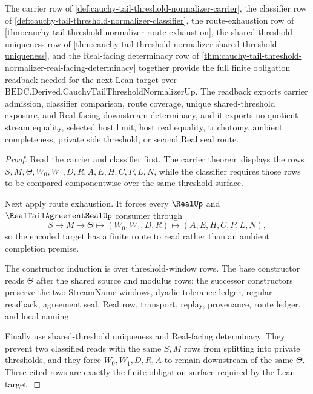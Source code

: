 \begin{theorem}
\label{thm:cauchy-tail-threshold-normalizer-encoded-obligation-readback}
The carrier row of \autoref{def:cauchy-tail-threshold-normalizer-carrier}, the classifier row of \autoref{def:cauchy-tail-threshold-normalizer-classifier}, the route-exhaustion row of \autoref{thm:cauchy-tail-threshold-normalizer-route-exhaustion}, the shared-threshold uniqueness row of \autoref{thm:cauchy-tail-threshold-normalizer-shared-threshold-uniqueness}, and the Real-facing determinacy row of \autoref{thm:cauchy-tail-threshold-normalizer-real-facing-determinacy} together provide the full finite obligation readback needed for the next Lean target over $\mathrm{BEDC.Derived.CauchyTailThresholdNormalizerUp}$. The readback exports carrier admission, classifier comparison, route coverage, unique shared-threshold exposure, and Real-facing downstream determinacy, and it exports no quotient-stream equality, selected host limit, host real equality, trichotomy, ambient completeness, private side threshold, or second Real seal route.
\end{theorem}
\begin{proof}
Read the carrier and classifier first. The carrier theorem displays the rows $S,M,\Theta,W_0,W_1,D,R,A,E,H,C,P,L,N$, while the classifier requires those rows to be compared componentwise over the same threshold surface.

Next apply route exhaustion. It forces every $\RealUp$ and $\RealTailAgreementSealUp$ consumer through
$$
S\longmapsto M\longmapsto\Theta\longmapsto(W_0,W_1,D,R)\longmapsto(A,E,H,C,P,L,N),
$$
so the encoded target has a finite route to read rather than an ambient completion premise.

The constructor induction is over threshold-window rows. The base constructor reads $\Theta$ after the shared source and modulus rows; the successor constructors preserve the two StreamName windows, dyadic tolerance ledger, regular readback, agreement seal, Real row, transport, replay, provenance, route ledger, and local naming.

Finally use shared-threshold uniqueness and Real-facing determinacy. They prevent two classified reads with the same $S,M$ rows from splitting into private thresholds, and they force $W_0,W_1,D,R,A$ to remain downstream of the same $\Theta$. These cited rows are exactly the finite obligation surface required by the Lean target.
\end{proof}

